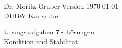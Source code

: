 




\vspace*{-20mm}
{
	\color{dhbwGray}
	Dr. Moritz Gruber	\hfill Version \today\\
	DHBW Karlsruhe\\
}

\vspace{10mm}
\begin{center}
	{
		{ \LARGE 	Übungsaufgaben 7 - Lösungen}\\[3mm]
		{\Large Kondition und Stabilität}
	}
\end{center}

\vspace{5mm}

